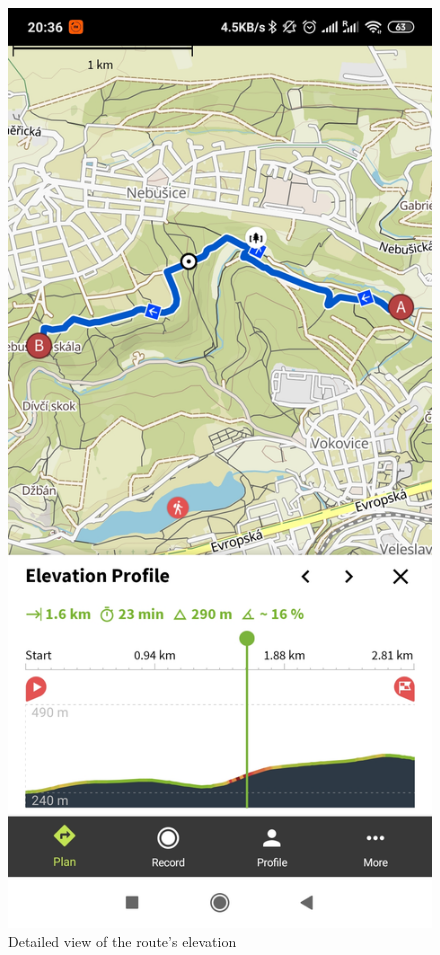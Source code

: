 \begin{figure}[h]
    \includegraphics[width=\textwidth]{Images/komoot-route-elevation-detail.jpg}
    \caption{Detailed view of the route's elevation\cite{komoot-route-elevation-detail-img}}
\end{figure}

